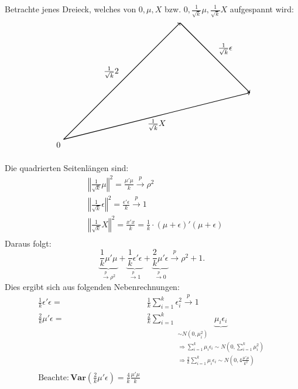 \documentclass[10pt]{article}
\newcommand{\KW}{\overset{p} \longrightarrow} %
\newcommand{\Var}{\textbf{Var}} %
\begin{document}
	Betrachte jenes Dreieck, welches von $0, \mu, X$ bzw. $0, \frac{1}{\sqrt{k}} \mu, \frac{1}{\sqrt{k}} X$ aufgespannt wird:
	\begin{align*}
			\begin{tikzpicture}
			\draw[thick, ->] (0,0) node[below left] {0} -- node[midway, above left] {$\frac{1}{\sqrt{k}}\mu$} (5,5);
			\draw[thick, ->] (5,5) -- node[midway, above right] {$\frac{1}{\sqrt{k}}\epsilon$} (8,2);
			\draw[thick, ->] (0,0) -- node[midway, below] {$\frac{1}{\sqrt{k}}X$} (8,2);
		\end{tikzpicture}
	\end{align*}	
	
	Die quadrierten Seitenlängen sind:
	\begin{equation*}
		\begin{split}
			&\left\Vert \frac{1}{\sqrt{k}} \mu \right\Vert^2 = \frac{\mu'\mu}{k} \KW \rho^2\\
			&\left\Vert \frac{1}{\sqrt{k}}\epsilon \right\Vert^2= \frac{\epsilon'\epsilon}{k}\KW 1\\
			&\left\Vert \frac{1}{\sqrt{k}}X\right\Vert^2= \frac{x'x}{k} = \frac{1}{k} \cdot (\mu + \epsilon)' (\mu+\epsilon) \\
		\end{split}
	\end{equation*}
	Daraus folgt:
	\begin{equation*}
		\underbrace{\frac{1}{k} \mu' \mu}_{\KW \rho^2} + \underbrace{\frac{1}{k} \epsilon'\epsilon}_{\KW 1} + \underbrace{\frac{2}{k} \mu' \epsilon}_{\KW 0} \KW \rho^2 +1.
	\end{equation*}
	Dies ergibt sich aus folgenden Nebenrechnungen:
	\begin{equation*}
		\begin{split}
			\frac{1}{k} \epsilon' \epsilon =& \frac{1}{k} \sum_{i=1}^{k} \epsilon_i^2 \KW 1\\
			\frac{2}{k} \mu' \epsilon =& \frac{2}{k} \sum_{i=1}^{k} \underbrace{\mu_i \epsilon_i}_{\substack{
					\scriptstyle \sim N(0,\mu_i^2) \\ 
					\scriptstyle \Rightarrow \sum_{i=1}^{k} \mu_i \epsilon_i \sim N(0, \textstyle \sum_{i=1}^{k} \mu_i^2) \\ 
					\scriptstyle \Rightarrow \frac{2}{k} \sum_{i=1}^{k} \mu_i \epsilon_i \sim N(0, 4\frac{\mu' \mu}{k^2})}} \\
                    \scriptstyle \text{Beachte}: \Var(\frac{2}{k}\mu'\epsilon) = \frac{4}{k} \frac{\mu'\mu}{k}
		\end{split}
	\end{equation*}
\end{document}
